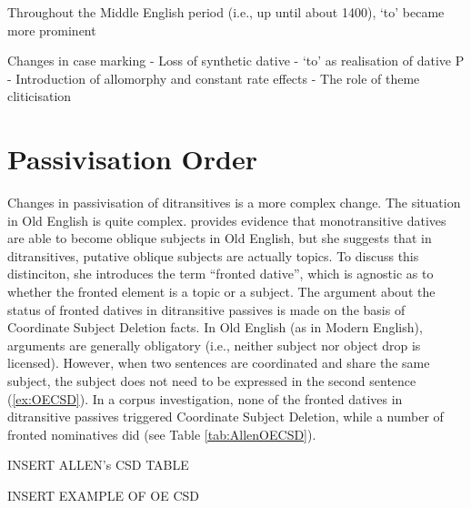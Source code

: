 Throughout the Middle English period (i.e., up until about 1400), `to' became more prominent 

Changes in case marking
	- Loss of synthetic dative
	- `to' as realisation of dative P
	- Introduction of allomorphy and constant rate effects
	- The role of theme cliticisation
\section{Passivisation Order}
	Changes in passivisation of ditransitives is a more complex change. The situation in Old English is quite complex. \cite{Allen.1999} provides evidence that monotransitive datives are able to become oblique subjects in Old English, but she suggests that in ditransitives, putative oblique subjects are actually topics. To discuss this distinciton, she introduces the term ``fronted dative'', which is agnostic as to whether the fronted element is a topic or a subject. The argument about the status of fronted datives in ditransitive passives is made on the basis of Coordinate Subject Deletion facts.
	In Old English (as in Modern English), arguments are generally obligatory (i.e., neither subject nor object drop is licensed). However, when two sentences are coordinated and share the same subject, the subject does not need to be expressed in the second sentence (\ref{ex:OECSD}). In a corpus investigation, none of the fronted datives in ditransitive passives triggered Coordinate Subject Deletion, while a number of fronted nominatives did (see Table \ref{tab:AllenOECSD}). 

	\begin{table}
		INSERT ALLEN's CSD TABLE
		\label{tab:AllenOECSD}
	\end{table}

	\begin{exe}
		\ex \label{ex:OECSD} INSERT EXAMPLE OF OE CSD
	\end{exe}

